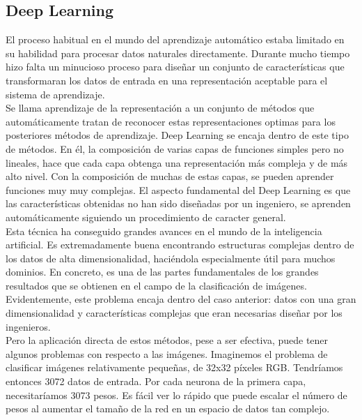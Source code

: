 \subsection{Deep Learning}

El proceso habitual en el mundo del aprendizaje automático estaba limitado en su habilidad para procesar datos naturales directamente. Durante mucho tiempo hizo falta un minucioso proceso para diseñar un conjunto de características que transformaran los datos de entrada en una representación aceptable para el sistema de aprendizaje\cite{lecun-nature}.\\

Se llama aprendizaje de la representación a un conjunto de métodos que automáticamente tratan de reconocer estas representaciones optimas para los posteriores métodos de aprendizaje. Deep Learning se encaja dentro de este tipo de métodos. En él, la composición de varias capas de funciones simples pero no lineales, hace que cada capa obtenga una representación más compleja y de más alto nivel. Con la composición de muchas de estas capas, se pueden aprender funciones muy muy complejas. El aspecto fundamental del Deep Learning es que las características obtenidas no han sido diseñadas por un ingeniero, se aprenden automáticamente siguiendo un procedimiento de caracter general.\\
 
Esta técnica ha conseguido grandes avances en el mundo de la inteligencia artificial. Es extremadamente buena encontrando estructuras complejas dentro de los datos de alta dimensionalidad, haciéndola especialmente útil para muchos dominios. En concreto, es una de las partes fundamentales de los grandes resultados que se obtienen en el campo de la clasificación de imágenes. Evidentemente, este problema encaja dentro del caso anterior: datos con una gran dimensionalidad y características complejas que eran necesarias diseñar por los ingenieros.\\

Pero la aplicación directa de estos métodos, pese a ser efectiva, puede tener algunos problemas con respecto a las imágenes. Imaginemos el problema de clasificar imágenes relativamente pequeñas, de 32x32 píxeles RGB. Tendríamos entonces 3072 datos de entrada. Por cada neurona de la primera capa, necesitaríamos 3073 pesos. Es fácil ver lo rápido que puede escalar el número de pesos al aumentar el tamaño de la red en un espacio de datos tan complejo.\\

